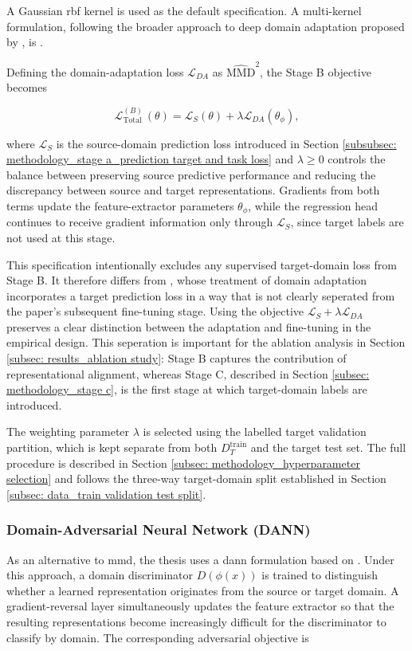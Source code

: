 A Gaussian \ac{rbf} kernel is used as the default specification. A multi-kernel formulation, following the broader approach to deep domain adaptation proposed by \textcite{longLearningTransferableFeatures2015}, is .

Defining the domain-adaptation loss $\mathcal{L}_{DA}$ as $\widehat{\mathrm{MMD}}^2$, the Stage B objective becomes

\begin{equation}
\mathcal{L}_{\text {Total }}^{(B)}(\theta)=\mathcal{L}_S(\theta)+\lambda \mathcal{L}_{D A}\left(\theta_\phi\right),
\end{equation}

\noindent where $\mathcal L_S$ is the source-domain prediction loss introduced in Section \ref{subsubsec: methodology_stage a_prediction target and task loss} and $\lambda \ge 0$ controls the balance between preserving source predictive performance and reducing the discrepancy between source and target representations. Gradients from both terms update the feature-extractor parameters $\theta_\phi$, while the regression head continues to receive gradient information only through $\mathcal L_S$, since target labels are not used at this stage.

This specification intentionally excludes any supervised target-domain loss from Stage B. It therefore differs from \textcite{mashettyTransferLearningCrossMarket2025a}, whose treatment of domain adaptation incorporates a target prediction loss in a way that is not clearly seperated from the paper's subsequent fine-tuning stage. Using the objective $\mathcal{L}_S+\lambda\mathcal{L}_{DA}$ preserves a clear distinction between the adaptation and fine-tuning in the empirical design. This seperation is important for the ablation analysis in Section \ref{subsec: results_ablation study}: Stage B captures the contribution of representational alignment, whereas Stage C, described in Section \ref{subsec: methodology_stage c}, is the first stage at which target-domain labels are introduced.

The weighting parameter $\lambda$ is selected using the labelled target validation partition, which is kept separate from both $D_T^\text{train}$ and the target test set. The full procedure is described in Section \ref{subsec: methodology_hyperparameter selection} and follows the three-way target-domain split established in Section \ref{subsec: data_train validation test split}. 

\subsubsection{Domain-Adversarial Neural Network (DANN)}
As an alternative to \ac{mmd}, the thesis uses a \ac{dann} formulation based on \textcite{ganinDomainAdversarialTrainingNeural2016}. Under this approach, a domain discriminator $D(\phi(x))$ is trained to distinguish whether a learned representation originates from the source or target domain. A gradient-reversal layer simultaneously updates the feature extractor so that the resulting representations become increasingly difficult for the discriminator to classify by domain. The corresponding adversarial objective is 

